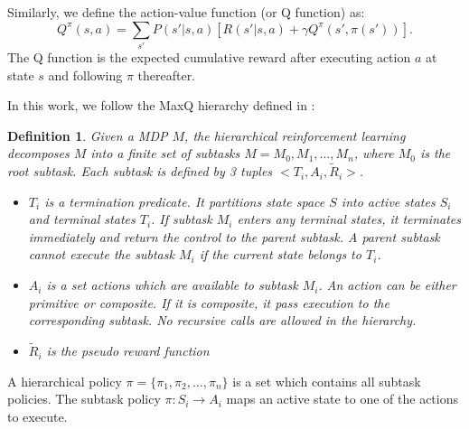 \documentclass{article} %
\newtheorem{definition}{Definition}
\begin{document}
Similarly, we define the action-value function (or Q function) as:
\begin{equation}
    Q^{\pi}(s, a) = \sum_{s'}P(s'|s, a)[R(s'|s, a) + \gamma Q^{\pi}(s', \pi(s'))].
    \label{eq:Q}
\end{equation}
The Q function is the expected cumulative reward after executing action $a$ at state $s$ and following
$\pi$ thereafter.




In this work, we follow the MaxQ hierarchy defined in \cite{MaxQJ}:
\begin{definition}
    Given a MDP $M$, the hierarchical reinforcement learning decomposes $M$ into a finite
    set of subtasks $M = {M_0, M_1, \dots, M_n}$, where $M_0$ is the root subtask. 
    Each subtask is defined by 3 tuples $<T_i, A_i, \tilde{R}_i>$. 
    \begin{itemize}{}
    \item $T_i$ is a termination predicate. It partitions state space $S$ into active states $S_i$ and
                terminal states $T_i$. If subtask $M_i$ enters any terminal states, it terminates immediately
                and return the control to the parent subtask. A parent subtask cannot execute the subtask
                $M_i$ if the current state belongs to $T_i$.
    \item $A_i$ is a set actions which are available to subtask $M_i$. An action can be either primitive or composite.
                If it is composite, it pass execution to the corresponding subtask. No recursive calls 
                are allowed in the hierarchy.
    \item $\tilde{R}_i$ is the pseudo reward function 
    \end{itemize}
\end{definition}
A hierarchical policy $\pi = \{\pi_1, \pi_2, \dots, \pi_n\}$ is a set which contains all subtask policies. 
The subtask policy $\pi: S_i \rightarrow A_i$ maps an active state to one of the actions to execute.
\end{document}
